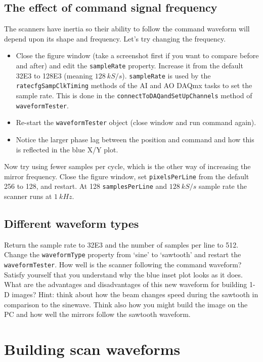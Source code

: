 \documentclass[a4paper]{report}
\begin{document}
\clearpage
\subsection{The effect of command signal frequency}
The scanners have inertia so their ability to follow the command waveform will depend upon its shape and frequency. 
Let's try changing the frequency. 

\begin{itemize}
\item Close the figure window (take a screenshot first if you want to compare before and after) and edit the \texttt{sampleRate} property.
Increase it from the default 32E3 to 128E3 (meaning $128~kS/s$). 
\texttt{sampleRate} is used by the \texttt{ratecfgSampClkTiming} methods of the AI and AO DAQmx tasks to set the sample rate.
This is done in the \texttt{connectToDAQandSetUpChannels} method of \texttt{waveformTester}.
\item Re-start the \texttt{waveformTester} object (close window and run command again). 
\item Notice the larger phase lag between the position and command and how this is reflected in the blue X/Y plot. 
\end{itemize}

\noindent
Now try using fewer samples per cycle, which is the other way of increasing the mirror frequency. 
Close the figure window, set \texttt{pixelsPerLine} from the default 256 to 128, and restart.
At 128 \texttt{samplesPerLine} and $128~kS/s$ sample rate the scanner runs at $1~kHz$.

\subsection{Different waveform types}
Return the sample rate to 32E3 and the number of samples per line to 512. 
Change the \texttt{waveformType} property from `sine' to `sawtooth' and restart the \texttt{waveformTester}. 
How well is the scanner following the command waveform? 
Satisfy yourself that you understand why the blue inset plot looks as it does. 
What are the advantages and disadvantages of this new waveform for building 1-D images?
Hint: think about how the beam changes speed during the sawtooth in comparison to the sinewave.
Think also how you might build the image on the PC and how well the mirrors follow the sawtooth waveform.


\clearpage

\section{Building scan waveforms}
\end{document}

